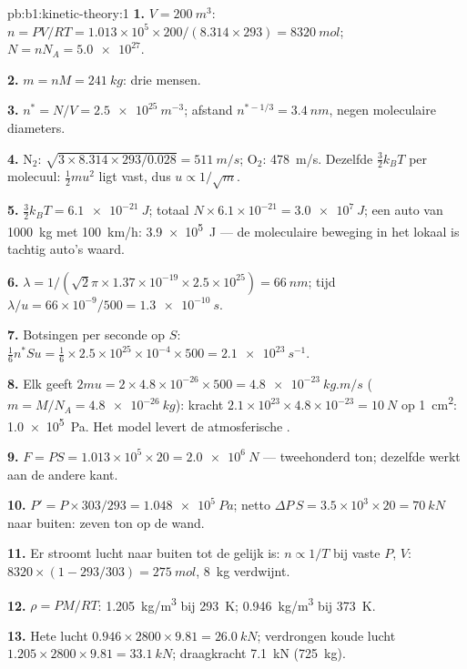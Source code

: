 \begin{solution}{pb:b1:kinetic-theory:1}
\textbf{1.} $V = \qty{200}{m^3}$: $n = PV/RT = 1.013\times10^5 \times 200/(8.314
\times 293) = \qty{8320}{mol}$; $N = nN_A = \num{5.0e27}$.

\textbf{2.} $m = nM = \qty{241}{kg}$: drie mensen.

\textbf{3.} $n^* = N/V = \qty{2.5e25}{m^{-3}}$; afstand $n^{*-1/3} = \qty{3.4}{nm}$,
negen moleculaire diameters.

\textbf{4.} N$_2$: $\sqrt{3 \times 8.314 \times 293/0.028} = \qty{511}{m/s}$;
O$_2$: \qty{478}{m/s}. Dezelfde $\tfrac32 k_BT$ per molecuul: $\tfrac12 mu^2$ ligt vast,
dus $u \propto 1/\sqrt m$.

\textbf{5.} $\tfrac32 k_BT = \qty{6.1e-21}{J}$; totaal $N \times 6.1\times10^{-21}
= \qty{3.0e7}{J}$; een auto van \qty{1000}{kg} met \qty{100}{km/h}: \qty{3.9e5}{J} ---
de moleculaire beweging in het lokaal is tachtig auto's waard.

\textbf{6.} $\lambda = 1/(\sqrt2\pi \times 1.37\times10^{-19} \times 2.5\times10^{25})
= \qty{66}{nm}$; tijd $\lambda/u = 66\times10^{-9}/500 = \qty{1.3e-10}{s}$.

\textbf{7.} Botsingen per seconde op $S$: $\tfrac16 n^*Su = \tfrac16 \times 2.5\times
10^{25} \times 10^{-4} \times 500 = \qty{2.1e23}{s^{-1}}$.

\textbf{8.} Elk geeft $2mu = 2 \times 4.8\times10^{-26} \times 500 = \qty{4.8e-23}{kg.m/s}$
($m = M/N_A = \qty{4.8e-26}{kg}$): kracht $2.1\times10^{23} \times 4.8\times10^{-23}
= \qty{10}{N}$ op \qty{1}{cm^2}: \qty{1.0e5}{Pa}. Het model levert
de atmosferische .

\textbf{9.} $F = PS = 1.013\times10^5 \times 20 = \qty{2.0e6}{N}$ --- tweehonderd
ton; dezelfde  werkt aan de andere kant.

\textbf{10.} $P' = P \times 303/293 = \qty{1.048e5}{Pa}$; netto $\Delta P\,S = 3.5
\times10^3 \times 20 = \qty{70}{kN}$ naar buiten: zeven ton op de wand.

\textbf{11.} Er stroomt lucht naar buiten tot de  gelijk is: $n \propto 1/T$ bij
vaste $P$, $V$: $8320 \times (1 - 293/303) = \qty{275}{mol}$, \qty{8}{kg}
verdwijnt.

\textbf{12.} $\rho = PM/RT$: \qty{1.205}{kg/m^3} bij \qty{293}{K}; \qty{0.946}{kg/m^3}
bij \qty{373}{K}.

\textbf{13.} Hete lucht $0.946 \times 2800 \times 9.81 = \qty{26.0}{kN}$; verdrongen
koude lucht $1.205 \times 2800 \times 9.81 = \qty{33.1}{kN}$; draagkracht \qty{7.1}{kN}
(\qty{725}{kg}).


\end{solution}
